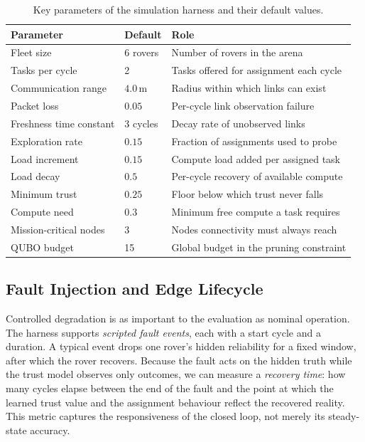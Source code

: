 \begin{table}[htbp]
  \centering
  \caption{Key parameters of the simulation harness and their default
    values.}
  \label{tab:sim-params}
  \begin{tabular}{@{}llp{5.6cm}@{}}
    \toprule
    Parameter & Default & Role \\
    \midrule
    Fleet size & 6 rovers & Number of rovers in the arena \\
    Tasks per cycle & 2 & Tasks offered for assignment each cycle \\
    Communication range & $4.0$\,m & Radius within which links can exist \\
    Packet loss & $0.05$ & Per-cycle link observation failure \\
    Freshness time constant & 3 cycles & Decay rate of unobserved links \\
    Exploration rate & $0.15$ & Fraction of assignments used to probe \\
    Load increment & $0.15$ & Compute load added per assigned task \\
    Load decay & $0.5$ & Per-cycle recovery of available compute \\
    Minimum trust & $0.25$ & Floor below which trust never falls \\
    Compute need & $0.3$ & Minimum free compute a task requires \\
    Mission-critical nodes & 3 & Nodes connectivity must always reach \\
    QUBO budget & 15 & Global budget in the pruning constraint \\
    \bottomrule
  \end{tabular}
\end{table}

\subsection{Fault Injection and Edge Lifecycle}

Controlled degradation is as important to the evaluation as nominal
operation. The harness supports \emph{scripted fault events}, each with a
start cycle and a duration. A typical event drops one rover's hidden
reliability for a fixed window, after which the rover recovers. Because
the fault acts on the hidden truth while the trust model observes only
outcomes, we can measure a \emph{recovery time}: how many cycles elapse
between the end of the fault and the point at which the learned trust
value and the assignment behaviour reflect the recovered reality. This
metric captures the responsiveness of the closed loop, not merely its
steady-state accuracy.

